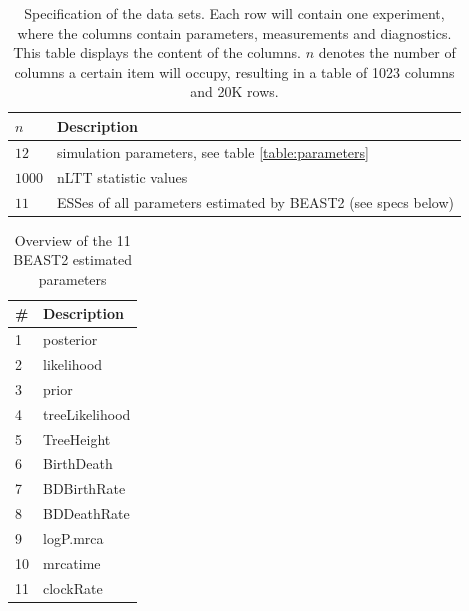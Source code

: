 \documentclass{article}
\begin{document}
\begin{table}
  \centering 
  \begin{tabular}{l l}
    \hline
    $n$ & Description \\
    \hline
    \hline
    $12$   & simulation parameters, see table \ref{table:parameters} \\
    $1000$ & nLTT statistic values \\
    $11$ & ESSes of all parameters estimated by BEAST2 (see specs below) \\
    \hline
  \end{tabular}
  \caption{
    Specification of the data sets. Each row will contain one experiment,
    where the columns contain parameters, measurements and diagnostics.
    This table displays the content of the columns. 
    $n$ denotes the number
    of columns a certain item will occupy, resulting in a table of 
    1023 columns and 20K rows.
  }
  \label{table:specs}
\end{table}

\begin{table}
  \centering 
  \begin{tabular}{l l}
    \hline
    \# & Description \\
    \hline
    \hline
    1 & posterior \\
    2 & likelihood \\
    3 & prior \\
    4 & treeLikelihood \\
    5 & TreeHeight \\
    6 & BirthDeath \\
    7 & BDBirthRate \\
    8 & BDDeathRate \\
    9 & logP.mrca \\
    10 & mrcatime \\
    11 & clockRate \\
    \hline
  \end{tabular}
  \caption{
    Overview of the 11 BEAST2 estimated parameters
  }
  \label{table:estimated_parameters}
\end{table}
\end{document}
